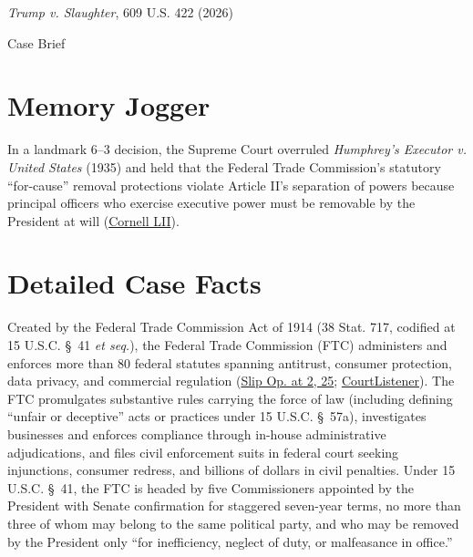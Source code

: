\documentclass[12pt]{article}
\begin{document}
\begin{center}
{\LARGE \textit{Trump v. Slaughter}, 609 U.S. 422 (2026)\par}
\vspace{0.8em}
{\large Case Brief\par}
\end{center}
\vspace{1em}

\section{Memory Jogger}

In a landmark 6--3 decision, the Supreme Court overruled \textit{Humphrey's Executor v. United States} (1935) and held that the Federal Trade Commission's statutory ``for-cause'' removal protections violate Article II's separation of powers because principal officers who exercise executive power must be removable by the President at will (\href{https://www.law.cornell.edu/supremecourt/text/25-332}{Cornell LII}).

\section{Detailed Case Facts}

Created by the Federal Trade Commission Act of 1914 (38 Stat. 717, codified at 15 U.S.C. \S~41 \textit{et seq.}), the Federal Trade Commission (FTC) administers and enforces more than 80 federal statutes spanning antitrust, consumer protection, data privacy, and commercial regulation (\href{https://www.supremecourt.gov/opinions/25pdf/25-322_new_4gcj.pdf}{Slip Op. at 2, 25}; \href{https://www.courtlistener.com/opinion/10881681/trump-v-slaughter/}{CourtListener}). The FTC promulgates substantive rules carrying the force of law (including defining ``unfair or deceptive'' acts or practices under 15 U.S.C. \S~57a), investigates businesses and enforces compliance through in-house administrative adjudications, and files civil enforcement suits in federal court seeking injunctions, consumer redress, and billions of dollars in civil penalties. Under 15 U.S.C. \S~41, the FTC is headed by five Commissioners appointed by the President with Senate confirmation for staggered seven-year terms, no more than three of whom may belong to the same political party, and who may be removed by the President only ``for inefficiency, neglect of duty, or malfeasance in office.''
\end{document}
